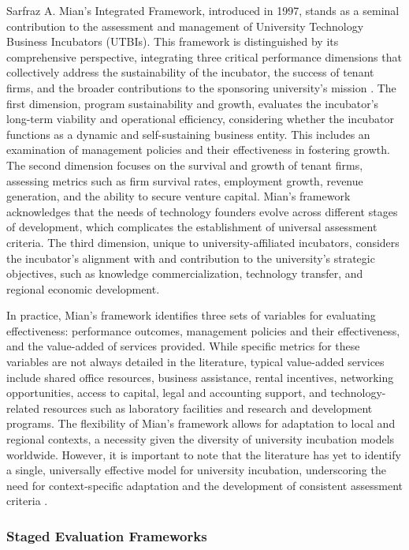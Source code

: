 \documentclass[../Main.tex]{subfiles}
\begin{document}
Sarfraz A. Mian's Integrated Framework, introduced in 1997, stands as a seminal contribution to the assessment and management of University Technology Business Incubators (UTBIs). This framework is distinguished by its comprehensive perspective, integrating three critical performance dimensions that collectively address the sustainability of the incubator, the success of tenant firms, and the broader contributions to the sponsoring university's mission \cite{Chan2005Assessing}. The first dimension, program sustainability and growth, evaluates the incubator's long-term viability and operational efficiency, considering whether the incubator functions as a dynamic and self-sustaining business entity. This includes an examination of management policies and their effectiveness in fostering growth. The second dimension focuses on the survival and growth of tenant firms, assessing metrics such as firm survival rates, employment growth, revenue generation, and the ability to secure venture capital. Mian's framework acknowledges that the needs of technology founders evolve across different stages of development, which complicates the establishment of universal assessment criteria. The third dimension, unique to university-affiliated incubators, considers the incubator's alignment with and contribution to the university's strategic objectives, such as knowledge commercialization, technology transfer, and regional economic development.

In practice, Mian's framework identifies three sets of variables for evaluating effectiveness: performance outcomes, management policies and their effectiveness, and the value-added of services provided. While specific metrics for these variables are not always detailed in the literature, typical value-added services include shared office resources, business assistance, rental incentives, networking opportunities, access to capital, legal and accounting support, and technology-related resources such as laboratory facilities and research and development programs. The flexibility of Mian's framework allows for adaptation to local and regional contexts, a necessity given the diversity of university incubation models worldwide. However, it is important to note that the literature has yet to identify a single, universally effective model for university incubation, underscoring the need for context-specific adaptation and the development of consistent assessment criteria \cite{Yovera2025Academic}.

\subsubsection{Staged Evaluation Frameworks}
\end{document}
